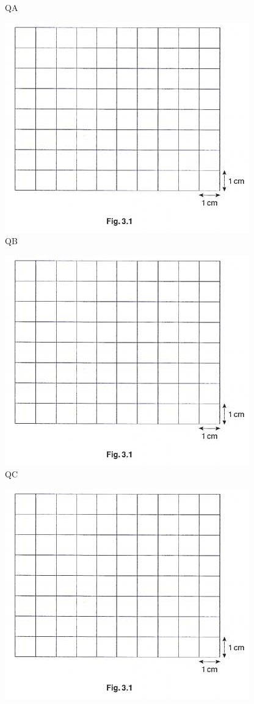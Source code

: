 \documentclass[10pt,a4paper]{article}
\begin{document}
\begin{enumerate}
\begin{figure}[hbtp]
				\caption{QA}
				\end{figure}
				\newpage
				\begin{figure}[hbtp]
				\centering
				\includegraphics[scale=0.5]{teljes/osc.jpg}
				\caption{QB}
				\end{figure}
				\begin{figure}[hbtp]
				\centering
				\includegraphics[scale=0.5]{teljes/osc.jpg}
				\caption{QC}
				\end{figure}
				\newpage
				\begin{figure}[hbtp]
				\centering
				\includegraphics[scale=0.5]{teljes/osc.jpg}

\end{figure}
\end{enumerate}
\end{document}
